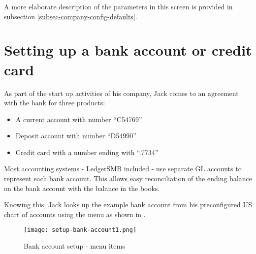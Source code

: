 
A more elaborate description of the parameters in this screen is provided in subsection
\ref{subsec-company-config-defaults}.

\section{Setting up a bank account or credit card}
\label{sec-first-login-setup-bank-account}

As part of the start up activities of his company, Jack comes to an agreement with the
bank for three products:

\begin{itemize}
\item A current account with number ``C54769''
\item Deposit account with number ``D54990''
\item Credit card with a number ending with ``.7734''
\end{itemize}

Most accounting systems - LedgerSMB included - use separate GL accounts to represent
each bank account. This allows easy reconciliation of the ending balance on the bank
account with the balance in the books.

Knowing this, Jack looks up the example bank account from his preconfigured US chart of
accounts using the  menu as
shown in .

\begin{figure}[h]
\texttt{[image: setup-bank-account1.png]}
\caption{Bank account setup - menu items}
\label{fig:bank-setup1}
\end{figure}

